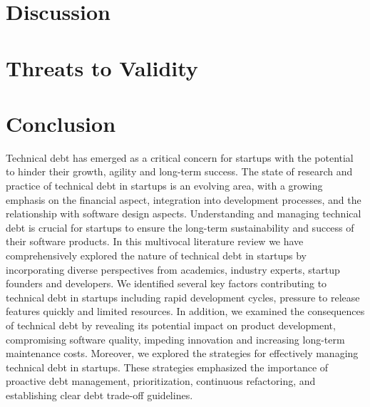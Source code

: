 \section{Discussion}\label{Sec:Discussion}



\section{Threats to Validity}\label{Sec:Threats}


\section{Conclusion}\label{Sec:Conclusion}
Technical debt has emerged as a critical concern for startups with the potential to hinder their growth, agility and long-term success. The state of research and practice of technical debt in startups is an evolving area, with a growing emphasis on the financial aspect, integration into development processes, and the relationship with software design aspects. Understanding and managing technical debt is crucial for startups to ensure the long-term sustainability and success of their software products.
In this multivocal literature review we have comprehensively explored the nature of technical debt in startups by incorporating diverse perspectives from academics, industry experts, startup founders and developers. We identified several key factors contributing to technical debt in startups including rapid development cycles, pressure to release features quickly and limited resources. In addition, we examined the consequences of technical debt by revealing its potential impact on product development, compromising software quality, impeding innovation and increasing long-term maintenance costs. Moreover, we explored the strategies for effectively managing technical debt in startups. These strategies emphasized the importance of proactive debt management, prioritization, continuous refactoring, and establishing clear debt trade-off guidelines.

